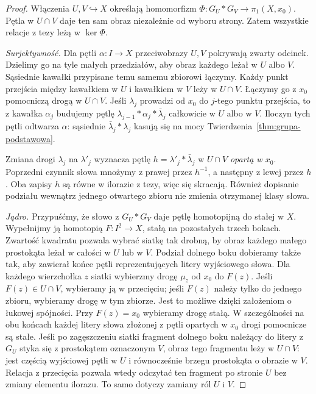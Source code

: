 \begin{proof}
Włączenia $U,V\hookrightarrow X$
określają homomorfizm
$\Phi:G_U*G_V\to\pi_1(X,x_0)$.
Pętla w $U\cap V$ daje ten sam obraz
niezależnie od wyboru strony.
Zatem wszystkie relacje z tezy
leżą w $\ker\Phi$.

\emph{Surjektywność.} Dla pętli
$\alpha:I\to X$ przeciwobrazy $U,V$
pokrywają zwarty odcinek. Dzielimy
go na tyle małych przedziałów,
aby obraz każdego leżał w $U$ albo $V$.
Sąsiednie kawałki przypisane temu
samemu zbiorowi łączymy. Każdy
punkt przejścia między kawałkiem
w $U$ i kawałkiem w $V$ leży w
$U\cap V$. Łączymy go z $x_0$
pomocniczą drogą w $U\cap V$.
Jeśli $\lambda_j$ prowadzi od $x_0$
do $j$-tego punktu przejścia,
to z kawałka $\alpha_j$ budujemy
pętlę $\lambda_{j-1}*\alpha_j*
\bar\lambda_j$ całkowicie w $U$
albo w $V$. Iloczyn tych pętli
odtwarza $\alpha$: sąsiednie
$\bar\lambda_j*\lambda_j$
kasują się na mocy
Twierdzenia~\ref{thm:grupa-podstawowa}.

Zmiana drogi $\lambda_j$ na $\lambda'_j$
wyznacza pętlę $h=\lambda'_j*\bar\lambda_j$ w $U\cap V$
\emph{opartą w $x_0$}. Poprzedni czynnik słowa mnożymy z prawej
przez $h^{-1}$, a następny z lewej przez $h$.
Oba zapisy $h$ są równe w ilorazie z tezy, więc się skracają.
Również dopisanie podziału wewnątrz
jednego otwartego zbioru nie zmienia
otrzymanej klasy słowa.

\emph{Jądro.} Przypuśćmy, że słowo
z $G_U*G_V$ daje pętlę homotopijną
do stałej w $X$. Wypełnijmy ją
homotopią $F:I^2\to X$, stałą na
pozostałych trzech bokach.
Zwartość kwadratu pozwala wybrać
siatkę tak drobną, by obraz
każdego małego prostokąta leżał
w całości w $U$ lub w $V$.
Podział dolnego boku dobieramy także tak, aby zawierał końce
pętli reprezentujących litery wyjściowego słowa.
Dla każdego wierzchołka $z$ siatki wybierzmy drogę $\mu_z$
od $x_0$ do $F(z)$. Jeśli $F(z)\in U\cap V$, wybieramy ją
w przecięciu; jeśli $F(z)$ należy tylko do jednego zbioru,
wybieramy drogę w tym zbiorze. Jest to możliwe dzięki założeniom
o łukowej spójności. Przy $F(z)=x_0$ wybieramy drogę stałą.
W szczególności na obu końcach każdej litery słowa złożonej
z pętli opartych w $x_0$ drogi pomocnicze są stałe.
Jeśli po zagęszczeniu siatki fragment dolnego boku należący
do litery z $G_U$ styka się z prostokątem oznaczonym $V$,
obraz tego fragmentu leży w $U\cap V$:
jest częścią wyjściowej pętli w $U$ i równocześnie
brzegu prostokąta o obrazie w $V$.
Relacja z przecięcia pozwala wtedy odczytać ten fragment
po stronie $U$ bez zmiany elementu ilorazu. To samo dotyczy
zamiany ról $U$ i $V$.


\end{proof}
